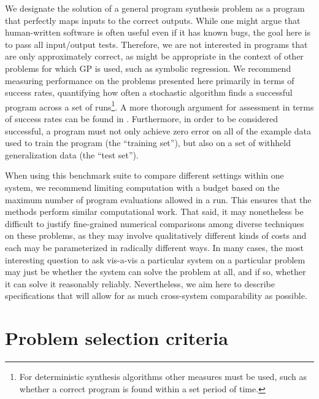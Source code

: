\documentclass{sig-alternate}
\begin{document}
We designate the solution of a general program synthesis problem as a program that perfectly maps inputs to the correct outputs. While one might argue that human-written software is often useful even if it has known bugs, the goal here is to pass all input/output tests. Therefore, we are not interested in programs that are only approximately correct, as might be appropriate in the context of other problems for which GP is used, such as symbolic regression. We recommend measuring performance on the problems presented here primarily in terms of success rates, quantifying how often a stochastic algorithm finds a successful program across a set of runs\footnote{For deterministic synthesis algorithms other measures must be used, such as whether a correct program is found within a set period of time.}. A more thorough argument for assessment in terms of success rates can be found in \cite{Helmuth:2014:GECCO}.
Furthermore, in order to be considered successful, a program must not only achieve zero error on all of the example data used to train the program (the ``training set''), but also on a set of withheld generalization data (the ``test set''). 



When using this benchmark suite to compare different settings within one system, we recommend limiting computation with a budget based on the maximum number of program evaluations allowed in a run. This ensures that the methods perform similar computational work. That said, it may nonetheless be difficult to justify fine-grained numerical comparisons among diverse techniques on these problems, as they may involve qualitatively different kinds of costs and each may be parameterized in radically different ways. In many cases, the most interesting question to ask vis-a-vis a particular system on a particular problem may just be whether the system can solve the problem at all, and if so,  whether it can solve it reasonably reliably. Nevertheless, we aim here to describe specifications that will allow for as much cross-system comparability as possible. %


\section{Problem selection criteria} \label{requirements}
\end{document}
